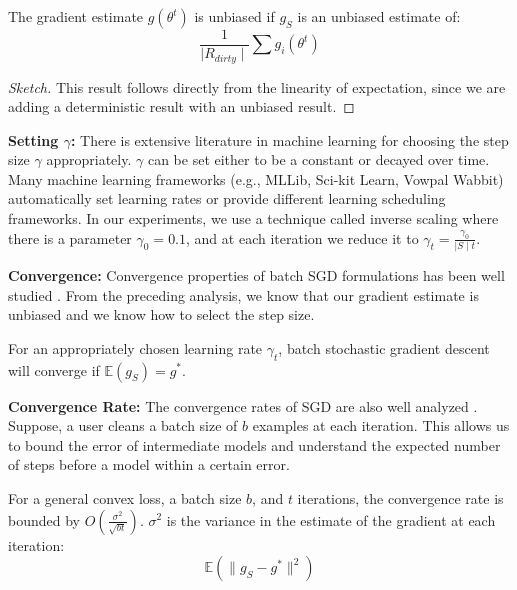 \begin{lemma}
The gradient estimate $g(\theta^{t})$ is unbiased if $g_S$ is an unbiased estimate of:
\[
\frac{1}{\mid R_{dirty} \mid} \sum g_i(\theta^{t})
\]
\end{lemma}
\begin{proof}[Sketch]
This result follows directly from the linearity of expectation, since we are adding a deterministic result with an unbiased result.
\end{proof}

\vspace{0.5em}

\noindent\textbf{ Setting $\gamma$: } There is extensive literature in machine learning for choosing the step size $\gamma$ appropriately. $\gamma$ can be set either to be a constant or decayed over time. Many machine learning frameworks (e.g., MLLib, Sci-kit Learn, Vowpal Wabbit) automatically set learning rates or provide different learning scheduling frameworks. 
In our experiments, we use a technique called inverse scaling where there is a parameter $\gamma_0=0.1$, and at each iteration we reduce it to $\gamma_t = \frac{\gamma_0}{\mid S \mid t}$. 

\vspace{0.5em}

\noindent\textbf{ Convergence: } Convergence properties of batch SGD formulations has been well studied \cite{dekel2012optimal}. From the preceding analysis, we know that our gradient estimate is unbiased and we know how to select the step size.  

\begin{proposition}
For an appropriately chosen learning rate $\gamma_t$, batch stochastic gradient descent will converge if $\mathbb{E}(g_S)=g^*$.
\label{unbiased}
\end{proposition}

\vspace{0.5em}

\noindent\textbf{ Convergence Rate: } The convergence rates of SGD are also well analyzed \cite{dekel2012optimal,bertsekas2011incremental,zhao2014stochastic}. 
Suppose, a user cleans a batch size of $b$ examples at each iteration.
This allows us to bound the error of intermediate models and understand the expected number of steps before a model within a certain error. 

\begin{proposition}
For a general convex loss, a batch size $b$, and $t$ iterations, the convergence rate is bounded by $O(\frac{\sigma^2}{\sqrt{bt}})$. 
$\sigma^2$ is the variance in the estimate of the gradient at each iteration:
\[
\mathbb{E}(\|g_S - g^*\|^2)
\]
\end{proposition}

